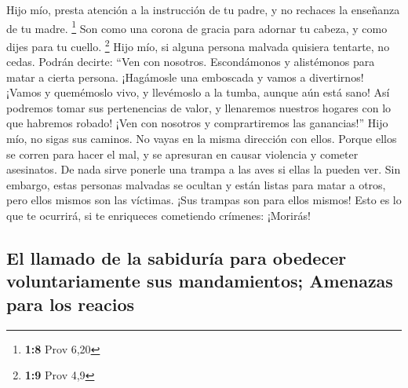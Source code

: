  Hijo mío, presta atención a la instrucción de tu padre, y
no rechaces la enseñanza de tu madre. \footnote{\textbf{1:8} Prov 6,20}
 Son como una corona de gracia para adornar tu cabeza, y
como dijes para tu cuello. \footnote{\textbf{1:9} Prov 4,9}
 Hijo mío, si alguna persona malvada quisiera tentarte, no
cedas.  Podrán decirte: ``Ven con nosotros. Escondámonos y
alistémonos para matar a cierta persona. ¡Hagámosle una emboscada y
vamos a divertirnos!  ¡Vamos y quemémoslo vivo, y
llevémoslo a la tumba, aunque aún está sano!  Así podremos
tomar sus pertenencias de valor, y llenaremos nuestros hogares con lo
que habremos robado!  ¡Ven con nosotros y comprartiremos
las ganancias!''  Hijo mío, no sigas sus caminos. No vayas
en la misma dirección con ellos.  Porque ellos se corren
para hacer el mal, y se apresuran en causar violencia y cometer
asesinatos.  De nada sirve ponerle una trampa a las aves si
ellas la pueden ver.  Sin embargo, estas personas malvadas
se ocultan y están listas para matar a otros, pero ellos mismos son las
víctimas. ¡Sus trampas son para ellos mismos!  Esto es lo
que te ocurrirá, si te enriqueces cometiendo crímenes: ¡Morirás!

\hypertarget{el-llamado-de-la-sabiduruxeda-para-obedecer-voluntariamente-sus-mandamientos-amenazas-para-los-reacios}{%
\subsection{El llamado de la sabiduría para obedecer voluntariamente sus
mandamientos; Amenazas para los
reacios}\label{el-llamado-de-la-sabiduruxeda-para-obedecer-voluntariamente-sus-mandamientos-amenazas-para-los-reacios}}

